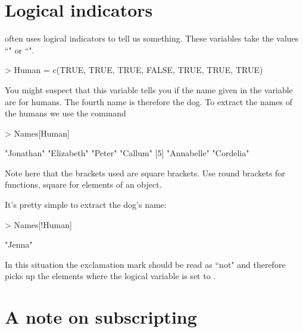 \section{Logical indicators} 
 
\R{} often uses logical indicators to tell us something. These variables take the values ``" or ``". 
 

\begin{Schunk}
\begin{Sinput}
> Human = c(TRUE, TRUE, TRUE, FALSE, TRUE, TRUE, TRUE) 
\end{Sinput}
\end{Schunk}

You might suspect that this variable tells you if the name given in the  variable are for humans. The fourth name is therefore the dog. To extract the names of the humans we use the command 

\begin{Schunk}
\begin{Sinput}
> Names[Human] 
\end{Sinput}
\begin{Soutput}
[1] "Jonathan"  "Elizabeth" "Peter"     "Callum"   
[5] "Annabelle" "Cordelia" 
\end{Soutput}
\end{Schunk}

Note here that the brackets used are square brackets. Use round brackets for functions, square for elements of an object. 
 
It's pretty simple to extract the dog's name: 

\begin{Schunk}
\begin{Sinput}
> Names[!Human] 
\end{Sinput}
\begin{Soutput}
[1] "Jenna"
\end{Soutput}
\end{Schunk}

In this situation the exclamation mark should be read as ``not" and therefore picks up the elements where the logical variable is set to . 
 
\section{A note on subscripting} 
 
